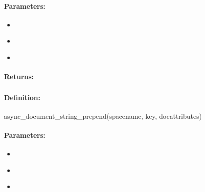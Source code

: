 \paragraph{Parameters:}
\begin{itemize}[noitemsep]
\item {}\\

\item {}\\

\item {}\\

\end{itemize}

\paragraph{Returns:}


\pagebreak
\subsubsection{}
\label{api:ruby:async_document_string_prepend}


\paragraph{Definition:}
\begin{rubycode}
async_document_string_prepend(spacename, key, docattributes)
\end{rubycode}

\paragraph{Parameters:}
\begin{itemize}[noitemsep]
\item {}\\

\item {}\\

\item {}\\

\end{itemize}

